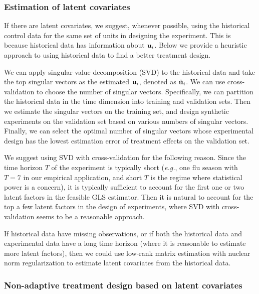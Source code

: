 {\subsubsection{Estimation of latent covariates}\label{subsubsec:estimate-latent-covariates}
\texttt{}
 
If there are latent covariates, we suggest, whenever possible, using the historical control data for the same set of units in designing the experiment. This is because historical data has information about $\mathbf{u}_i$. Below we provide a heuristic approach to using historical data to find a better treatment design. 


We can apply singular value decomposition (SVD) to the historical data and take the top singular vectors as the estimated $\mathbf{u}_i$, denoted as $\hat{\mathbf{u}}_i$. We can use cross-validation to choose the number of singular vectors.
Specifically, we can partition the historical data in the time dimension into training and validation sets. Then we estimate the singular vectors on the training set, and design synthetic experiments on the validation set based on various numbers of singular vectors. Finally, we can select the optimal number of singular vectors whose experimental design has the lowest estimation error of treatment effects on the validation set.

We suggest using SVD with cross-validation for the following reason. Since the time horizon $T$ of the experiment is typically short ({\it e.g.}, one flu season with $T = 7$ in our empirical application, and short $T$ is the regime where statistical power is a concern), it is typically sufficient to account for the first one or two latent factors in the feasible GLS estimator. Then it is natural to account for the top a few latent factors in the design of experiments, where SVD with cross-validation seems to be a reasonable approach. 

If historical data have missing observations, or if both the historical data and experimental data have a long time horizon (where it is reasonable to estimate more latent factors), then we could use low-rank matrix estimation with nuclear norm regularization to estimate latent covariates from the historical data.


\subsubsection{Non-adaptive treatment design based on latent covariates}\label{subsubsec:choose-treatment-design}
\texttt{}

}
